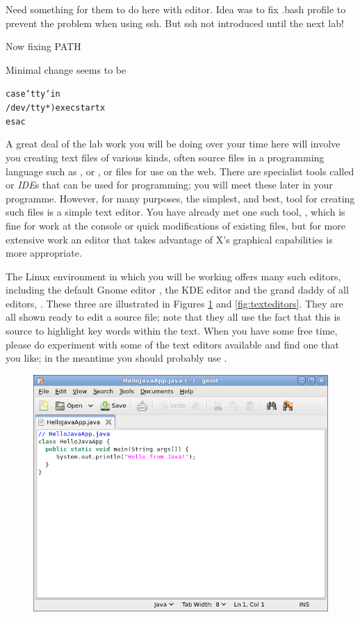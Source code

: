 \begin{note}
  Need something for them to do here with editor. Idea was to fix .bash profile to prevent the problem when using ssh. But ssh not introduced until the next lab!

  Now fixing PATH

  Minimal change seems to be

\begin{alltt}
case `tty` in
/dev/tty*) exec startx
esac
\end{alltt}
\end{note}

A great deal of the lab work you will be doing over your time here will involve you creating text files of various kinds, often source files in a programming language such as ,  or , or  files for use on the web. There are specialist tools called  or \emph{IDE}s that can be used for programming; you will meet these later in your programme. However, for many purposes, the simplest, and best, tool for creating such files is a simple text editor. You have already met one such tool, , which is fine for work at the console or quick modifications of existing files, but for more extensive work an editor that takes advantage of  X's graphical capabilities is more appropriate.

The Linux environment in which you will be working offers many such editors, including the default Gnome editor , the KDE editor  and the grand daddy of all editors, . These three are illustrated in Figures \ref{fig:gedit} and \ref{fig:texteditors}. They are all shown ready to edit a  source file; note that they all use the fact that this is  source to highlight key words within the text. When you have some free time, please do experiment with some of the text editors available and find one that you like; in the meantime you should probably use .

\begin{figure}
  \centering
\includegraphics[width=.7\textwidth]{images/gedit}  
  \caption{}
  \label{fig:gedit}
\end{figure}

